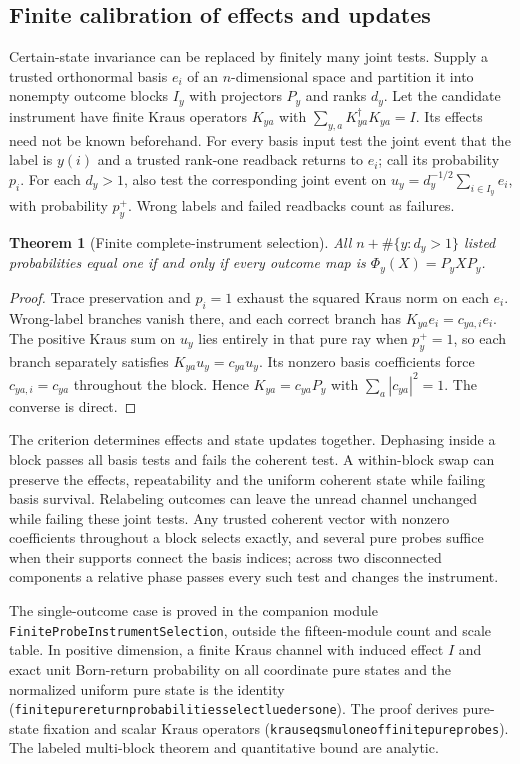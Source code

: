 \documentclass[11pt]{article}
\renewcommand{\_}{\textunderscore\allowbreak}
\newtheorem{theorem}{Theorem}
\theoremstyle{remark}
\begin{document}
\subsection{Finite calibration of effects and updates}

Certain-state invariance can be replaced by finitely many joint tests.
Supply a trusted orthonormal basis $e_i$ of an $n$-dimensional space and
partition it into nonempty outcome blocks $I_y$ with projectors $P_y$ and
ranks $d_y$. Let the candidate instrument have finite Kraus operators
$K_{ya}$ with $\sum_{y,a}K_{ya}^{\dagger}K_{ya}=I$. Its effects need
not be known beforehand. For every basis input test the joint event that
the label is $y(i)$ and a trusted rank-one readback returns to $e_i$;
call its probability $p_i$. For each $d_y>1$, also test the corresponding
joint event on $u_y=d_y^{-1/2}\sum_{i\in I_y}e_i$, with probability
$p_y^+$. Wrong labels and failed readbacks count as failures.

\begin{theorem}[Finite complete-instrument selection]
All $n+\#\{y:d_y>1\}$ listed probabilities equal one if and only if
every outcome map is $\Phi_y(X)=P_yXP_y$.
\end{theorem}
\begin{proof}
Trace preservation and $p_i=1$ exhaust the squared Kraus norm on each
$e_i$. Wrong-label branches vanish there, and each correct branch has
$K_{ya}e_i=c_{ya,i}e_i$. The positive Kraus sum on $u_y$ lies entirely
in that pure ray when $p_y^+=1$, so each branch separately satisfies
$K_{ya}u_y=c_{ya}u_y$. Its nonzero basis coefficients force
$c_{ya,i}=c_{ya}$ throughout the block. Hence
$K_{ya}=c_{ya}P_y$ with $\sum_a|c_{ya}|^2=1$. The converse is direct.
\end{proof}

The criterion determines effects and state updates together. Dephasing
inside a block passes all basis tests and fails the coherent test. A
within-block swap can preserve the effects, repeatability and the uniform
coherent state while failing basis survival. Relabeling outcomes can leave
the unread channel unchanged while failing these joint tests. Any trusted
coherent vector with nonzero coefficients throughout a block selects exactly,
and several pure probes suffice when their supports connect the basis indices;
across two disconnected components a relative phase passes every such test and
changes the instrument.

The single-outcome case is proved in the companion module
\texttt{FiniteProbeInstrumentSelection}, outside the fifteen-module count and
scale table. In positive dimension, a finite
Kraus channel with induced effect $I$ and exact unit Born-return probability
on all coordinate pure states and the normalized uniform pure state is the
identity (\texttt{finite\_pure\_return\_probabilities\_select\_lueders\_one}). The
proof derives pure-state fixation and scalar Kraus operators
(\texttt{kraus\_eq\_smul\_one\_of\_finite\_pure\_probes}).
The labeled multi-block theorem and quantitative bound are analytic.
\end{document}

